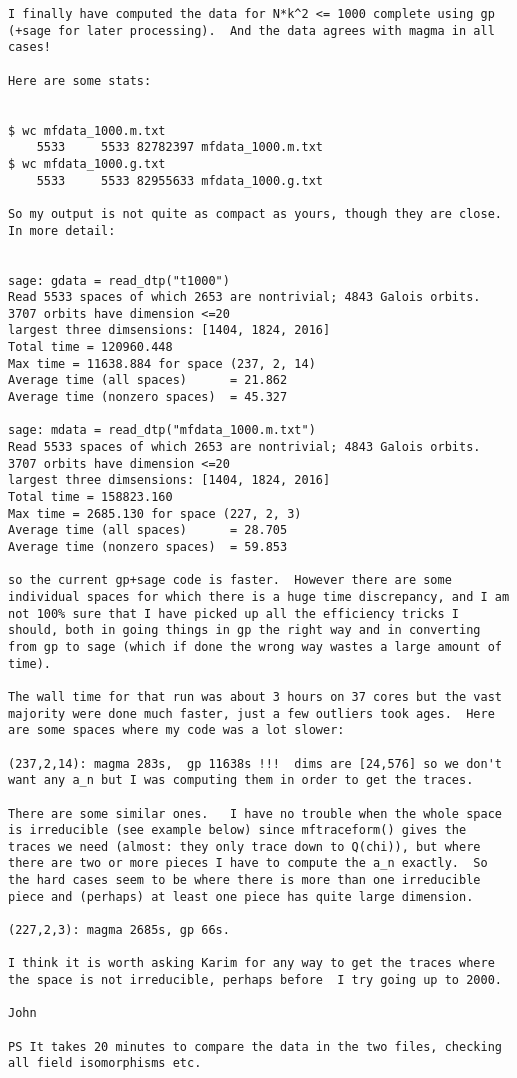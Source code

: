 \documentclass[11pt]{amsart}
\numberwithin{equation}{subsection}
\theoremstyle{definition}
\begin{document}
\begin{verbatim}
I finally have computed the data for N*k^2 <= 1000 complete using gp (+sage for later processing).  And the data agrees with magma in all cases!

Here are some stats:


$ wc mfdata_1000.m.txt 
    5533     5533 82782397 mfdata_1000.m.txt
$ wc mfdata_1000.g.txt 
    5533     5533 82955633 mfdata_1000.g.txt

So my output is not quite as compact as yours, though they are close.  In more detail:


sage: gdata = read_dtp("t1000")
Read 5533 spaces of which 2653 are nontrivial; 4843 Galois orbits.
3707 orbits have dimension <=20
largest three dimsensions: [1404, 1824, 2016]
Total time = 120960.448
Max time = 11638.884 for space (237, 2, 14)
Average time (all spaces)      = 21.862
Average time (nonzero spaces)  = 45.327

sage: mdata = read_dtp("mfdata_1000.m.txt")
Read 5533 spaces of which 2653 are nontrivial; 4843 Galois orbits.
3707 orbits have dimension <=20
largest three dimsensions: [1404, 1824, 2016]
Total time = 158823.160
Max time = 2685.130 for space (227, 2, 3)
Average time (all spaces)      = 28.705
Average time (nonzero spaces)  = 59.853

so the current gp+sage code is faster.  However there are some individual spaces for which there is a huge time discrepancy, and I am not 100% sure that I have picked up all the efficiency tricks I should, both in going things in gp the right way and in converting from gp to sage (which if done the wrong way wastes a large amount of time).

The wall time for that run was about 3 hours on 37 cores but the vast majority were done much faster, just a few outliers took ages.  Here are some spaces where my code was a lot slower:

(237,2,14): magma 283s,  gp 11638s !!!  dims are [24,576] so we don't want any a_n but I was computing them in order to get the traces.

There are some similar ones.   I have no trouble when the whole space is irreducible (see example below) since mftraceform() gives the traces we need (almost: they only trace down to Q(chi)), but where there are two or more pieces I have to compute the a_n exactly.  So the hard cases seem to be where there is more than one irreducible piece and (perhaps) at least one piece has quite large dimension.

(227,2,3): magma 2685s, gp 66s.

I think it is worth asking Karim for any way to get the traces where the space is not irreducible, perhaps before  I try going up to 2000.

John

PS It takes 20 minutes to compare the data in the two files, checking all field isomorphisms etc.
\end{verbatim}
\end{document}
